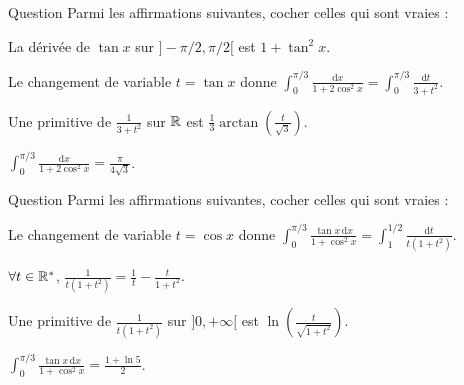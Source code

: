 \begin{multi}{Question}
Parmi les affirmations suivantes, cocher celles qui sont vraies :

    \item* La dérivée de \(\tan x\) sur \(\displaystyle ]-\pi/2,\pi/2[\) est \(1+\tan ^2x\).
    \item Le changement de variable \(t=\tan x\) donne \(\displaystyle \int _0^{\pi/3}\frac{\mathrm{d}x}{1+2\cos ^2x}=\int _0^{\pi/3}\frac{\mathrm{d}t}{3+t^2}\).
    \item Une primitive de \(\displaystyle \frac{1}{3+t^2}\) sur \(\mathbb{R}\) est \(\displaystyle \frac{1}{3}\arctan \left(\frac{t}{\sqrt{3}}\right)\).
    \item* \(\displaystyle \int _0^{\pi/3}\frac{\mathrm{d}x}{1+2\cos ^2x}=\frac{\pi}{4\sqrt{3}}\).
\end{multi}


\begin{multi}{Question}
Parmi les affirmations suivantes, cocher celles qui sont vraies :

    \item Le changement de variable \(t=\cos x\) donne \(\displaystyle \int _0^{\pi/3}\frac{\tan x\, \mathrm{d}x}{1+\cos ^2x}=\int _1^{1/2}\frac{\mathrm{d}t}{t(1+t^2)}\).
    \item* \(\forall t\in \mathbb{R}^*\), \(\displaystyle \frac{1}{t(1+t^2)}=\frac{1}{t}-\frac{t}{1+t^2}\).
    \item* Une primitive de \(\displaystyle \frac{1}{t(1+t^2)}\) sur \(]0,+\infty[\) est \(\displaystyle \ln \left(\frac{t}{\sqrt{1+t^2}}\right)\).
    \item \(\displaystyle \int _0^{\pi/3}\frac{\tan x\, \mathrm{d}x}{1+\cos ^2x}=\frac{1+\ln 5}{2}\).
\end{multi}


